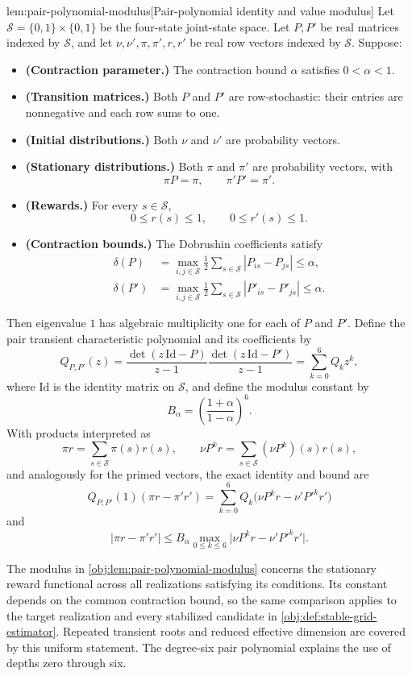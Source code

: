 \begin{lemmav}{lem:pair-polynomial-modulus}[Pair-polynomial identity and value modulus]
Let \(\mathcal S=\{0,1\}\times\{0,1\}\) be the four-state joint-state space. Let \(P,P'\) be real matrices indexed by \(\mathcal S\), and let \(\nu,\nu',\pi,\pi',r,r'\) be real row vectors indexed by \(\mathcal S\). Suppose:
\begin{itemize}
\item \textbf{(Contraction parameter.)} The contraction bound \(\alpha\) satisfies \(0<\alpha<1\).
\item \textbf{(Transition matrices.)} Both \(P\) and \(P'\) are row-stochastic: their entries are nonnegative and each row sums to one.
\item \textbf{(Initial distributions.)} Both \(\nu\) and \(\nu'\) are probability vectors.
\item \textbf{(Stationary distributions.)} Both \(\pi\) and \(\pi'\) are probability vectors, with
\[
\pi P=\pi,\qquad \pi'P'=\pi'.
\]
\item \textbf{(Rewards.)} For every \(s\in\mathcal S\),
\[
0\le r(s)\le1,\qquad 0\le r'(s)\le1.
\]
\item \textbf{(Contraction bounds.)} The Dobrushin coefficients satisfy
\[
\begin{aligned}
\delta(P)&=\max_{i,j\in\mathcal S}\frac12
 \sum_{s\in\mathcal S}|P_{is}-P_{js}|\le\alpha,\\
\delta(P')&=\max_{i,j\in\mathcal S}\frac12
 \sum_{s\in\mathcal S}|P'_{is}-P'_{js}|\le\alpha.
\end{aligned}
\]
\end{itemize}
Then eigenvalue \(1\) has algebraic multiplicity one for each of \(P\) and \(P'\). Define the pair transient characteristic polynomial and its coefficients by
\[
Q_{P,P'}(z)
=\frac{\det(z\,\mathrm{Id}-P)}{z-1}
 \frac{\det(z\,\mathrm{Id}-P')}{z-1}
=\sum_{k=0}^{6}Q_k z^k,
\]
where \(\mathrm{Id}\) is the identity matrix on \(\mathcal S\), and define the modulus constant by
\[
B_\alpha=\left(\frac{1+\alpha}{1-\alpha}\right)^6.
\]
With products interpreted as
\[
\pi r=\sum_{s\in\mathcal S}\pi(s)r(s),
\qquad
\nu P^k r=\sum_{s\in\mathcal S}(\nu P^k)(s)r(s),
\]
and analogously for the primed vectors, the exact identity and bound are
\[
Q_{P,P'}(1)(\pi r-\pi'r')
=\sum_{k=0}^{6}Q_k\bigl(\nu P^k r-\nu'P'^k r'\bigr)
\]
and
\[
|\pi r-\pi'r'|
\le B_\alpha
 \max_{0\le k\le6}\bigl|\nu P^k r-\nu'P'^k r'\bigr|.
\]
\end{lemmav}

The modulus in \cref{obj:lem:pair-polynomial-modulus} concerns the stationary reward functional across all realizations satisfying its conditions. Its constant depends on the common contraction bound, so the same comparison applies to the target realization and every stabilized candidate in \cref{obj:def:stable-grid-estimator}. Repeated transient roots and reduced effective dimension are covered by this uniform statement. The degree-six pair polynomial explains the use of depths zero through six.

